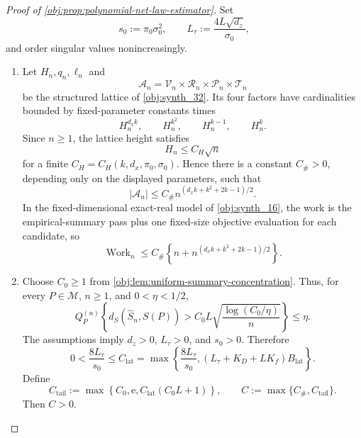 \documentclass[11pt]{article}
\begin{document}
\begin{proof}[Proof of \cref{obj:prop:polynomial-net-law-estimator}]
Set
\[
s_0:=\pi_0\sigma_0^2,\qquad
L_\tau:=\frac{4L\sqrt{d_z}}{\sigma_0},
\]
and order singular values nonincreasingly.

\begin{enumerate}
\item Let \(H_n,q_n,\ell_n\) and
\[
\mathcal A_n=\mathcal V_n\times\mathcal R_n\times\mathcal P_n\times\mathcal T_n
\]
be the structured lattice of \cref{obj:synth_32}.  Its four factors have cardinalities bounded by fixed-parameter constants times
\[
H_n^{d_xk},\qquad H_n^{k^2},\qquad H_n^{k-1},\qquad H_n^k .
\]
Since \(n\ge1\), the lattice height satisfies
\[
H_n\le C_H\sqrt n
\]
for a finite \(C_H=C_H(k,d_x,\pi_0,\sigma_0)\).  Hence there is a constant
\(C_\#>0\), depending only on the displayed parameters, such that
\[
|\mathcal A_n|
\le C_\# n^{(d_xk+k^2+2k-1)/2}.
\]
In the fixed-dimensional exact-real model of \cref{obj:synth_16}, the work is the empirical-summary pass plus one fixed-size objective evaluation for each candidate, so
\[
\operatorname{Work}_n
\le
C_\#\left\{n+n^{(d_xk+k^2+2k-1)/2}\right\}.
\] %

\item Choose \(C_0\ge1\) from \cref{obj:lem:uniform-summary-concentration}.  Thus, for every \(P\in\mathcal M\), \(n\ge1\), and \(0<\eta<1/2\),
\[
Q_P^{(n)}
\left\{
d_S(\widehat S_n,S(P))
>
C_0L\sqrt{\frac{\log(C_0/\eta)}{n}}
\right\}
\le\eta .
\]
The assumptions imply \(d_z>0\), \(L_\tau>0\), and \(s_0>0\).  Therefore
\[
0<\frac{8L_\tau}{s_0}
\le
C_{\mathrm{lat}}
=
\max\!\left\{\frac{8L_\tau}{s_0},
(L_\tau+K_D+LK_f)B_{\mathrm{lat}}\right\}.
\]
Define
\[
C_{\mathrm{tail}}
:=
\max\!\left\{C_0,\mathrm e,C_{\mathrm{lat}}(C_0L+1)\right\},
\qquad
C:=\max\{C_\#,C_{\mathrm{tail}}\}.
\]
Then \(C>0\). %


\end{enumerate}
\end{proof}
\end{document}
